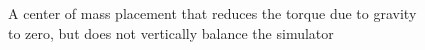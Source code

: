 

\begin{figure}
    \centering
    
    \caption{A center of mass placement that reduces the torque due to gravity to zero, but does not vertically balance the simulator}
    \label{fig:mbs_null_sol}
\end{figure}

